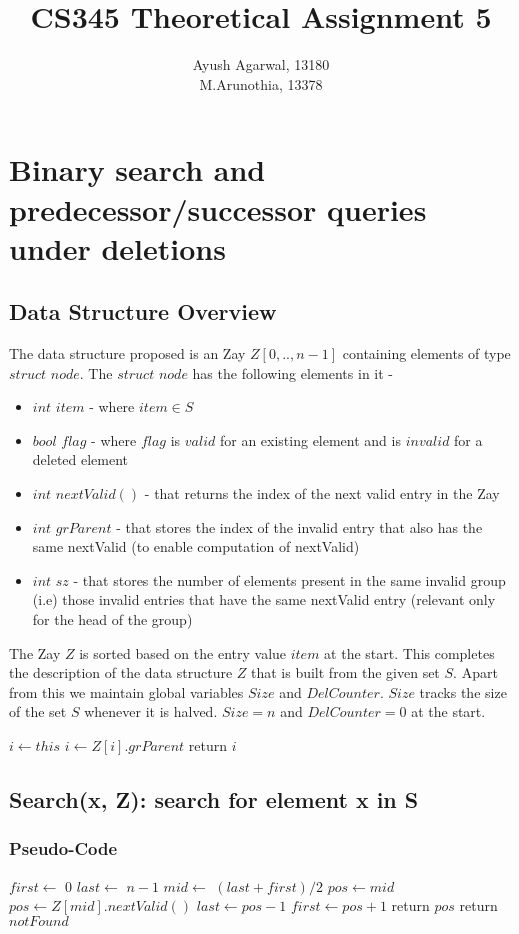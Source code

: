 \documentclass{article}
\title{CS345 Theoretical Assignment 5 \\ }
\author{\vspace{2mm} \large Ayush Agarwal, 13180 \\ M.Arunothia, 13378}
\date{}
\begin{document}
\maketitle
\tableofcontents
\newpage
\section{Binary search and predecessor/successor queries under deletions}
\subsection{Data Structure Overview}
The data structure proposed is an Zay $Z[0,..,n-1]$ containing elements of type $struct$ $node$. The $struct$ $node$ has the following elements in it - \\
\begin{itemize}
\item $int$ $item$ - where $item \in S$
\item $bool$ $flag$ - where $flag$ is $valid$ for an existing element and is $invalid$ for a deleted element
\item $int$ $nextValid()$ - that returns the index of the next valid entry in the Zay
\item $int$ $grParent$ - that stores the index of the invalid entry that also has the same nextValid (to enable computation of nextValid)
\item $int$ $sz$ - that stores the number of elements present in the same invalid group (i.e) those invalid entries that have the same nextValid entry (relevant only for the head of the group)  
\end{itemize}
The Zay $Z$ is sorted based on the entry value $item$ at the start. This completes the description of the data structure $Z$ that is built from the given set $S$. Apart from this we maintain global variables $Size$ and $DelCounter$. $Size$ tracks the size of the set $S$ whenever it is halved. $Size = n$ and $DelCounter = 0$ at the start.
\begin{algorithmic}[1]
  \State $ i \gets this$
  \State $i \gets Z[i].grParent$
  \EndWhile
  \State return $i$
  \EndProcedure
\end{algorithmic} 
\subsection{Search(x, Z): search for element x in S}
\subsubsection{Pseudo-Code}
\begin{algorithmic}[1]
  \State $first \gets$ $0$
  \State $last \gets$ $n-1$
  \State $mid \gets$ $(last + first)/2$
  \State $pos \gets mid$
  \Else
  \State $pos \gets Z[mid].nextValid()$  
  \EndIf
  \State $last \gets pos-1  $
  \State $first \gets pos+1$
  \Else
  \State return $pos$
  \EndIf
  \EndWhile
  \State return $notFound$
  \EndProcedure
\end{algorithmic} 
\end{document}
